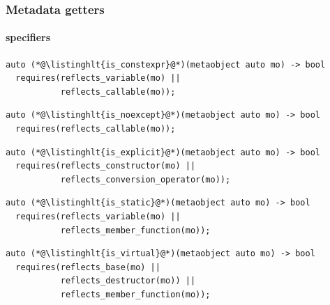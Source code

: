 \documentclass[aspectratio=169,compress,table,xcolor=table]{beamer}
\begin{document}
\begin{frame}[fragile]
  \frametitle{Metadata getters}
  \framesubtitle{specifiers}
  \begin{lstlisting}[language=c++2x,basicstyle=\footnotesize\ttfamily]
auto (*@\listinghlt{is_constexpr}@*)(metaobject auto mo) -> bool
  requires(reflects_variable(mo) ||
           reflects_callable(mo));
  \end{lstlisting}
  \vfill
  \begin{lstlisting}[language=c++2x,basicstyle=\footnotesize\ttfamily]
auto (*@\listinghlt{is_noexcept}@*)(metaobject auto mo) -> bool
  requires(reflects_callable(mo));
  \end{lstlisting}
  \vfill
  \begin{lstlisting}[language=c++2x,basicstyle=\footnotesize\ttfamily]
auto (*@\listinghlt{is_explicit}@*)(metaobject auto mo) -> bool
  requires(reflects_constructor(mo) ||
           reflects_conversion_operator(mo));
  \end{lstlisting}
  \vfill
  \begin{lstlisting}[language=c++2x,basicstyle=\footnotesize\ttfamily]
auto (*@\listinghlt{is_static}@*)(metaobject auto mo) -> bool
  requires(reflects_variable(mo) ||
           reflects_member_function(mo));
  \end{lstlisting}
  \vfill
  \begin{lstlisting}[language=c++2x,basicstyle=\footnotesize\ttfamily]
auto (*@\listinghlt{is_virtual}@*)(metaobject auto mo) -> bool
  requires(reflects_base(mo) ||
           reflects_destructor(mo)) ||
           reflects_member_function(mo));
  \end{lstlisting}
\end{frame}
\end{document}
